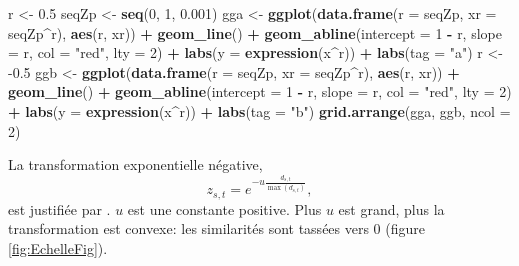 \documentclass[
  11pt,
  french,
  a4paper,
  extrafontsizes,onecolumn,openright
  ]{memoir}
\newenvironment{Shaded}{\begin{snugshade}}{\end{snugshade}}
\newcommand{\DataTypeTok}[1]{\textcolor[rgb]{0.13,0.29,0.53}{#1}}
\newcommand{\DecValTok}[1]{\textcolor[rgb]{0.00,0.00,0.81}{#1}}
\newcommand{\FloatTok}[1]{\textcolor[rgb]{0.00,0.00,0.81}{#1}}
\newcommand{\KeywordTok}[1]{\textcolor[rgb]{0.13,0.29,0.53}{\textbf{#1}}}
\newcommand{\NormalTok}[1]{#1}
\newcommand{\OperatorTok}[1]{\textcolor[rgb]{0.81,0.36,0.00}{\textbf{#1}}}
\newcommand{\StringTok}[1]{\textcolor[rgb]{0.31,0.60,0.02}{#1}}
\begin{document}
\begin{Shaded}
\begin{Highlighting}[]
\NormalTok{r <-}\StringTok{ }\FloatTok{0.5}
\NormalTok{seqZp <-}\StringTok{ }\KeywordTok{seq}\NormalTok{(}\DecValTok{0}\NormalTok{, }\DecValTok{1}\NormalTok{, }\FloatTok{0.001}\NormalTok{)}
\NormalTok{gga <-}\StringTok{ }\KeywordTok{ggplot}\NormalTok{(}\KeywordTok{data.frame}\NormalTok{(}\DataTypeTok{r =}\NormalTok{ seqZp, }\DataTypeTok{xr =}\NormalTok{ seqZp}\OperatorTok{^}\NormalTok{r), }\KeywordTok{aes}\NormalTok{(r, xr)) }\OperatorTok{+}
\StringTok{    }\KeywordTok{geom_line}\NormalTok{() }\OperatorTok{+}\StringTok{ }\KeywordTok{geom_abline}\NormalTok{(}\DataTypeTok{intercept =} \DecValTok{1} \OperatorTok{-}\StringTok{ }\NormalTok{r, }\DataTypeTok{slope =}\NormalTok{ r, }\DataTypeTok{col =} \StringTok{"red"}\NormalTok{,}
    \DataTypeTok{lty =} \DecValTok{2}\NormalTok{) }\OperatorTok{+}\StringTok{ }\KeywordTok{labs}\NormalTok{(}\DataTypeTok{y =} \KeywordTok{expression}\NormalTok{(x}\OperatorTok{^}\NormalTok{r)) }\OperatorTok{+}\StringTok{ }\KeywordTok{labs}\NormalTok{(}\DataTypeTok{tag =} \StringTok{"a"}\NormalTok{)}
\NormalTok{r <-}\StringTok{ }\FloatTok{-0.5}
\NormalTok{ggb <-}\StringTok{ }\KeywordTok{ggplot}\NormalTok{(}\KeywordTok{data.frame}\NormalTok{(}\DataTypeTok{r =}\NormalTok{ seqZp, }\DataTypeTok{xr =}\NormalTok{ seqZp}\OperatorTok{^}\NormalTok{r), }\KeywordTok{aes}\NormalTok{(r, xr)) }\OperatorTok{+}
\StringTok{    }\KeywordTok{geom_line}\NormalTok{() }\OperatorTok{+}\StringTok{ }\KeywordTok{geom_abline}\NormalTok{(}\DataTypeTok{intercept =} \DecValTok{1} \OperatorTok{-}\StringTok{ }\NormalTok{r, }\DataTypeTok{slope =}\NormalTok{ r, }\DataTypeTok{col =} \StringTok{"red"}\NormalTok{,}
    \DataTypeTok{lty =} \DecValTok{2}\NormalTok{) }\OperatorTok{+}\StringTok{ }\KeywordTok{labs}\NormalTok{(}\DataTypeTok{y =} \KeywordTok{expression}\NormalTok{(x}\OperatorTok{^}\NormalTok{r)) }\OperatorTok{+}\StringTok{ }\KeywordTok{labs}\NormalTok{(}\DataTypeTok{tag =} \StringTok{"b"}\NormalTok{)}
\KeywordTok{grid.arrange}\NormalTok{(gga, ggb, }\DataTypeTok{ncol =} \DecValTok{2}\NormalTok{)}
\end{Highlighting}
\end{Shaded}

\normalsize

La transformation exponentielle négative,
\[z_{s,t} = e^{-u \frac{d_{s,t}}{\max{(d_{s,t})}}},\]
est justifiée par \textcite{Leinster2013}.
\(u\) est une constante positive.
Plus \(u\) est grand, plus la transformation est convexe: les similarités sont tassées vers 0 (figure \ref{fig:EchelleFig}).
\end{document}
